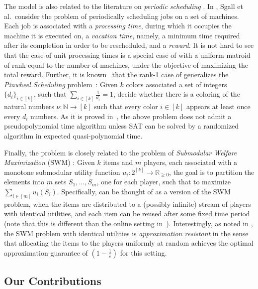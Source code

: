 The \mbb model is also related to the literature on {\em periodic scheduling} \cite{BNLT07, BNBNS02}. In \cite{SST09}, Sgall et al.\ consider the problem of periodically scheduling jobs on a set of machines. Each job is associated with a {\em processing time}, during which it occupies the machine it is executed on, a {\em vacation time}, namely, a minimum time required after its completion in order to be rescheduled, and a {\em reward}. It is not hard to see that the case of unit processing times is a special case of \mbb with a uniform matroid of rank equal to the number of machines, under the objective of maximizing the total reward.
Further, it is known~\cite{BSSS19} that the rank-1 case of \mbb generalizes the {\em Pinwheel Scheduling} problem~\cite{HMRTV89}: Given $k$ colors associated a set of integers $\{d_i\}_{i \in [k]}$, such that $\sum_{i \in [k]} \frac{1}{d_i} = 1$, decide whether there is a coloring of the natural numbers $\nu:\mathbb{N} \to [k]$ such that every color $i \in [k]$ appears at least once every $d_i$ numbers. As it is proved in~\cite{JL14}, the above problem does not admit a pseudopolynomial time algorithm unless SAT can be solved by a randomized algorithm in expected quasi-polynomial
time. 



Finally, the \rsm problem is closely related to the problem of {\em Submodular Welfare Maximization} (SWM) \cite{Von08,MSV08,KLMM05,FV10}: Given $k$ items and $m$ players, each associated with a monotone submodular utility function $u_i:2^{[k]}\rightarrow \mathbb{R}_{\geq 0}$, the goal is to partition the elements into $m$ sets $S_1, \dots, S_m$, one for each player, such that to maximize $\sum_{i \in [m]} u_i(S_i)$. Specifically, \rsm can be thought of as a version of the SWM problem, when the items are distributed to a (possibly infinite) stream of players with identical utilities, and each item can be reused after some fixed time period (note that this is different than the online setting in~\cite{KMZ15}). Interestingly, as noted in \cite{Von08}, the SWM problem with identical utilities is {\em approximation resistant} in the sense that allocating the items to the players uniformly at random achieves the optimal approximation guarantee of $\left(1 - \frac{1}{e}\right)$ for this setting.



\subsection{Our Contributions}

